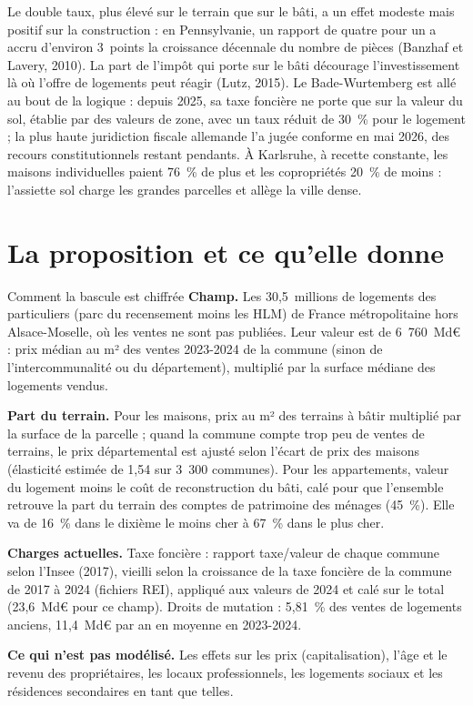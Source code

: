 \documentclass[11pt,a4paper]{article}
\begin{document}
Le double taux, plus élevé sur le terrain que sur le bâti, a un effet modeste mais positif sur la
construction : en Pennsylvanie, un rapport de quatre pour un a accru d'environ 3~points la croissance
décennale du nombre de pièces (Banzhaf et Lavery, 2010). La part de l'impôt qui porte sur le bâti décourage l'investissement là où l'offre
de logements peut réagir (Lutz, 2015). Le Bade-Wurtemberg est allé au bout de la logique : depuis 2025, sa
taxe foncière ne porte que sur la valeur du sol, établie par des valeurs de zone, avec un taux réduit de
30~\% pour le logement ; la plus haute juridiction fiscale allemande l'a jugée conforme en mai 2026, des recours
constitutionnels restant pendants. À Karlsruhe, à recette constante, les maisons individuelles paient
76~\% de plus et les copropriétés 20~\% de moins : l'assiette sol charge les grandes parcelles et allège la ville
dense.

\section{La proposition et ce qu'elle donne}

\begin{encadre}{Comment la bascule est chiffrée}
\textbf{Champ.} Les 30,5~millions de logements des particuliers (parc du recensement moins les HLM) de France
métropolitaine hors Alsace-Moselle, où les ventes ne sont pas publiées. Leur valeur est de 6~760~Md€ : prix
médian au m² des ventes 2023-2024 de la commune (sinon de l'intercommunalité ou du département), multiplié
par la surface médiane des logements vendus.

\textbf{Part du terrain.} Pour les maisons, prix au m² des terrains à bâtir multiplié par la surface de la
parcelle ; quand la commune compte trop peu de ventes de terrains, le prix départemental est ajusté selon
l'écart de prix des maisons (élasticité estimée de 1,54 sur 3~300 communes). Pour les appartements, valeur
du logement moins le coût de reconstruction du bâti, calé pour que l'ensemble retrouve la part du terrain
des comptes de patrimoine des ménages (45~\%). Elle va de 16~\% dans le dixième le moins cher à 67~\% dans le
plus cher.

\textbf{Charges actuelles.} Taxe foncière : rapport taxe/valeur de chaque commune selon l'Insee (2017),
vieilli selon la croissance de la taxe foncière de la commune de 2017 à 2024 (fichiers REI), appliqué aux
valeurs de 2024 et calé sur le total (23,6~Md€ pour ce champ). Droits de mutation : 5,81~\% des
ventes de logements anciens, 11,4~Md€ par an en moyenne en 2023-2024.

\textbf{Ce qui n'est pas modélisé.} Les effets sur les prix (capitalisation), l'âge et le revenu des
propriétaires, les locaux professionnels, les logements sociaux et les résidences secondaires en tant que
telles.
\end{encadre}
\end{document}
